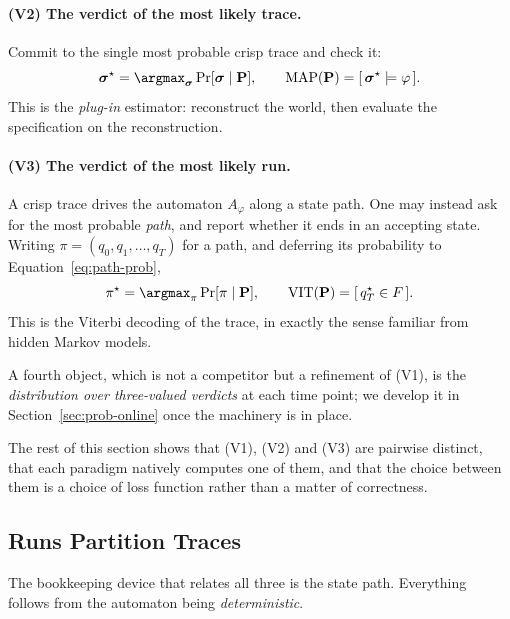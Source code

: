 \paragraph{(V2) The verdict of the most likely trace.} Commit to the single most probable crisp trace and check it:
\begin{equation}
  \boldsymbol{\sigma}^\star = \argmax_{\boldsymbol{\sigma}} \Pr[\boldsymbol{\sigma} \mid \mathbf{P}],
  \qquad
  \mathrm{MAP}(\mathbf{P}) = [\,\boldsymbol{\sigma}^\star \models \varphi\,].
  \label{eq:acc-map}
\end{equation}
This is the \emph{plug-in} estimator: reconstruct the world, then evaluate the specification on the reconstruction.

\paragraph{(V3) The verdict of the most likely run.} A crisp trace drives the automaton $A_\varphi$ along a state path. One may instead ask for the most probable \emph{path}, and report whether it ends in an accepting state. Writing $\pi = (q_0, q_1, \dots, q_T)$ for a path, and deferring its probability to Equation~\eqref{eq:path-prob},
\begin{equation}
  \pi^\star = \argmax_{\pi} \Pr[\pi \mid \mathbf{P}],
  \qquad
  \mathrm{VIT}(\mathbf{P}) = [\, q^\star_T \in F \,].
  \label{eq:acc-viterbi}
\end{equation}
This is the Viterbi decoding of the trace, in exactly the sense familiar from hidden Markov models.

\medskip
\noindent
A fourth object, which is not a competitor but a refinement of (V1), is the \emph{distribution over three-valued verdicts} at each time point; we develop it in Section~\ref{sec:prob-online} once the machinery is in place.

The rest of this section shows that (V1), (V2) and (V3) are pairwise distinct, that each paradigm natively computes one of them, and that the choice between them is a choice of loss function rather than a matter of correctness.

\subsection{Runs Partition Traces}
\label{sec:prob-paths}

The bookkeeping device that relates all three is the state path. Everything follows from the automaton being \emph{deterministic}.

